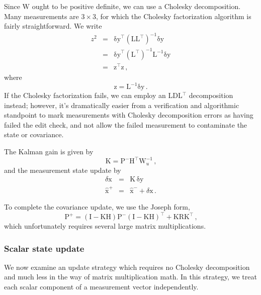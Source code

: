 \documentclass[12pt]{article}
\begin{document}
Since $\mathrm{W}$ ought to be positive definite, we can use a Cholesky decomposition. Many measurements are $3\times 3$, for which the Cholesky factorization algorithm is fairly straightforward. We write
\begin{eqnarray*}
z^2 &=& \mathrm{\delta y}^\top \left( \mathrm{L} \mathrm{L}^\top \right)^{-1}\mathrm{\delta y} \nonumber \\
      &=& \mathrm{\delta y}^\top \left( \mathrm{L}^\top \right)^{-1} \mathrm{L}^{-1} \mathrm{\delta y} \nonumber \\
      &=& \mathrm{z}^\top \mathrm{z}\,\text{,}
\end{eqnarray*}
where
\begin{equation}
\mathrm{z} = \mathrm{L}^{-1} \mathrm{\delta y}\,\text{.}
\end{equation}
If the Cholesky factorization fails, we can employ an LDL$^\top$ decomposition instead; however, it's dramatically easier from a verification and algorithmic standpoint to mark measurements with Cholesky decomposition errors as having failed the edit check, and not allow the failed measurement to contaminate the state or covariance.

The Kalman gain is given by
\begin{equation}
\mathrm{K} =  \mathrm{P}^{-}\mathrm{H}^\top \mathrm{W}_u^{-1}\,\text{,}
\end{equation}
and the measurement state update by
\begin{eqnarray}
\delta\mathrm{x} &=& \mathrm{K}\,\mathrm{\delta y} \\
\hat{\mathrm{x}}^{+} &=& \hat{\mathrm{x}}^{-} + \delta\mathrm{x}\,\text{.}
\end{eqnarray}

To complete the covariance update, we use the Joseph form,
\begin{equation}
\mathrm{P}^{+} = \left( \mathrm{I} - \mathrm{K} \mathrm{H} \right) \mathrm{P}^{-} \left( \mathrm{I} - \mathrm{K} \mathrm{H} \right)^\top + \mathrm{K} \mathrm{R} \mathrm{K}^\top\,\text{,} \label{eq:joseph_form}
\end{equation}
which unfortunately requires several large matrix multiplications.

\subsubsection{Scalar state update}

We now examine an update strategy which requires no Cholesky decomposition and much less in the way of matrix multiplication math. In this strategy, we treat each scalar component of a measurement vector independently.
\end{document}

